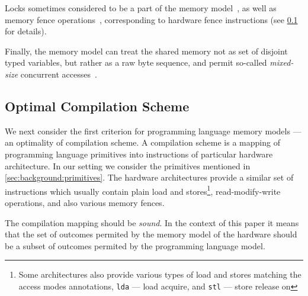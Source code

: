 Locks sometimes considered to be a part 
of the memory model~\cite{Manson-al:POPL05}, 
as well as memory fence operations~\cite{Batty-al:POPL11},
corresponding to hardware fence instructions
(see \cref{sec:background:compile} for details). 

Finally, the memory model can treat the shared memory 
not as set of disjoint typed variables, but rather as 
a raw byte sequence, and permit so-called \emph{mixed-size} 
concurrent accesses~\cite{Flur-al:POPL17}. 



\subsection{Optimal Compilation Scheme}
\label{sec:background:compile}

We next consider the first criterion for 
programming language memory models --- 
an optimality of compilation scheme. 
A compilation scheme is a mapping of 
programming language primitives into 
instructions of particular hardware architecture. 
In our setting we consider the primitives 
mentioned in \cref{sec:background:primitives}.
The hardware architectures provide a similar set 
of instructions which usually contain 
plain load and stores\footnote{Some architectures 
also provide various types of load and stores
matching the access modes annotations, 
\eg \texttt{lda} --- load acquire, 
and \texttt{stl} --- store release on }, 
read-modify-write operations, 
and also various memory fences.    

The compilation mapping should be \emph{sound}.
In the context of this paper it means that 
the set of outcomes permited by the 
memory model of the hardware should be 
a subset of outcomes permited by the 
programming language model. 

